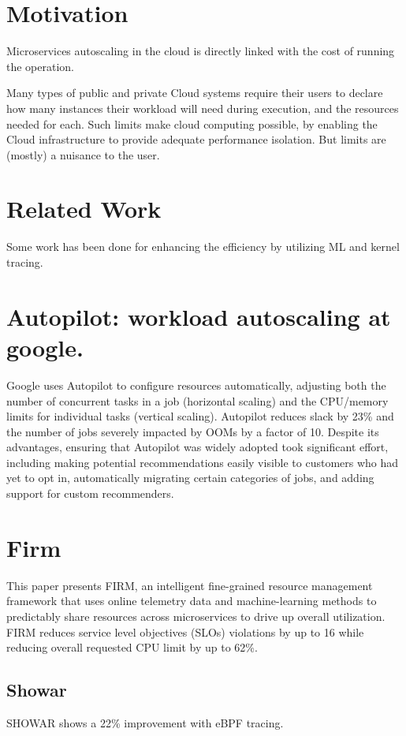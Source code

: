 \documentclass[conference]{IEEEtran}
\begin{document}
\section{Motivation}
Microservices autoscaling in the cloud is directly linked with the cost of running the operation.

Many types of public and private Cloud systems require their users to declare how many instances their workload will need during execution, and the resources needed for each. Such limits make cloud computing possible, by enabling the Cloud infrastructure to provide adequate performance isolation. But limits are (mostly) a nuisance to the user.

\section{Related Work}

Some work has been done for enhancing the efficiency by utilizing ML and kernel tracing.

\section{Autopilot: workload autoscaling at google.\cite{b5}}

Google uses Autopilot to configure resources automatically, adjusting both the number of concurrent tasks in a job (horizontal scaling) and the CPU/memory limits for individual tasks (vertical scaling). Autopilot reduces slack by 23\% and the number of jobs severely impacted by OOMs by a factor of 10. Despite its advantages, ensuring that Autopilot was widely adopted took significant effort, including making potential recommendations easily visible to customers who had yet to opt in, automatically migrating certain categories of jobs, and adding support for custom recommenders.

\section{Firm}
This paper presents FIRM, an intelligent fine-grained resource management framework that uses online telemetry data and machine-learning methods to predictably share resources across microservices to drive up overall utilization. FIRM reduces service level objectives (SLOs) violations by up to 16 while reducing overall requested CPU limit by up to 62\%.
\subsection{Showar\cite{b4}}
SHOWAR shows a 22\% improvement with eBPF tracing.
\end{document}
